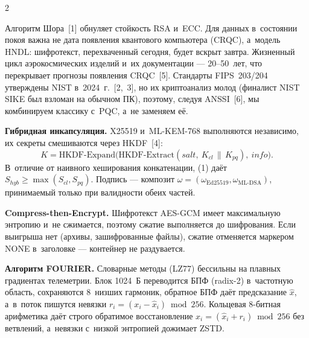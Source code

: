 \documentclass[a4paper,10pt]{article}
\newcommand{\sect}[2]{\par\vspace{1.4mm}\noindent{\sffamily\bfseries\fontsize{7}{8.5}\selectfont
  \if\relax\detokenize{#1}\relax\else\textcolor{pqc}{#1}\hspace{1.3mm}\fi\MakeUppercase{#2}}\par\nopagebreak\vspace{0.7mm}}
\begin{document}
\begin{multicols}{2}
\sect{1}{Проблема}
Алгоритм Шора~[1] обнуляет стойкость RSA и~ECC. Для данных в~состоянии покоя важна не дата появления квантового компьютера (CRQC), а~модель HNDL: шифротекст, перехваченный сегодня, будет вскрыт завтра. Жизненный цикл аэрокосмических изделий и~их документации — 20–50~лет, что перекрывает прогнозы появления CRQC~[5]. Стандарты FIPS~203/204 утверждены NIST в~2024~г.~[2,~3], но их криптоанализ молод (финалист NIST SIKE был взломан на обычном ПК), поэтому, следуя ANSSI~[6], мы комбинируем классику с~PQC, а~не заменяем её.

\sect{2}{Метод}
\noindent\textbf{Гибридная инкапсуляция.} X25519 и~ML-KEM-768 выполняются независимо, их секреты смешиваются через HKDF~[4]:
\begin{equation}
K = \mathrm{HKDF\text{-}Expand}\bigl(\mathrm{HKDF\text{-}Extract}(salt,\ K_{cl}\,\|\,K_{pq}),\ info\bigr).
\end{equation}
\noindent В~отличие от наивного хеширования конкатенации, (1) даёт $S_{hyb} \geq \max(S_{cl}, S_{pq})$. Подпись — композит $\omega = (\omega_{\mathrm{Ed25519}}, \omega_{\mathrm{ML\text{-}DSA}})$, принимаемый только при валидности обеих частей.

\textbf{Compress-then-Encrypt.} Шифротекст AES-GCM имеет максимальную энтропию и~не сжимается, поэтому сжатие выполняется до шифрования. Если выигрыша нет (архивы, зашифрованные файлы), сжатие отменяется маркером NONE в~заголовке — контейнер не раздувается.

\textbf{Алгоритм FOURIER.} Словарные методы (LZ77) бессильны на плавных градиентах телеметрии. Блок 1024~Б переводится БПФ (radix-2) в~частотную область, сохраняются 8~низших гармоник, обратное БПФ даёт предсказание $\hat{x}$, а~в~поток пишутся невязки $r_i = (x_i - \hat{x}_i) \bmod 256$. Кольцевая 8-битная арифметика даёт строго обратимое восстановление $x_i = (\hat{x}_i + r_i) \bmod 256$ без ветвлений, а~невязки с~низкой энтропией дожимает ZSTD.


\end{multicols}
\end{document}
